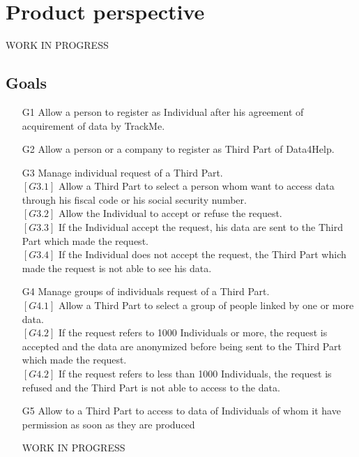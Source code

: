 \documentclass{report}
\begin{document}
		\section{Product perspective}
			WORK IN PROGRESS

			\subsection{Goals}
			\begin{itemize}
				\item[G1] Allow a person to register as Individual after his agreement of acquirement of data by TrackMe.
				
				\item[G2] Allow a person or a company to register as Third Part of Data4Help.

				\item[G3] Manage individual request of a Third Part.\\
				$\left[G3.1\right]$ Allow a Third Part to select a person whom want to access data through his fiscal code or his social security number.\\
				$\left[G3.2\right]$ Allow the Individual to accept or refuse the request.\\
				$\left[G3.3\right]$ If the Individual accept the request, his data are sent to the Third Part which made the request.\\
				$\left[G3.4\right]$ If the Individual does not accept the request, the Third Part which made the request is not able to see his data.
				
				\item[G4] Manage groups of individuals request of a Third Part.\\
				$\left[G4.1\right]$ Allow a Third Part to select a group of people linked by one or more data.\\
				$\left[G4.2\right]$ If the request refers to 1000 Individuals or more, the request is accepted and the data are anonymized before being sent to the Third Part which made the request.\\
				$\left[G4.2\right]$ If the request refers to less than 1000 Individuals, the request is refused and the Third Part is not able to access to the data.
				
				\item[G5] Allow to a Third Part to access to data of Individuals of whom it have permission as soon as they are produced
				
			WORK IN PROGRESS
			\end{itemize}
\end{document}
